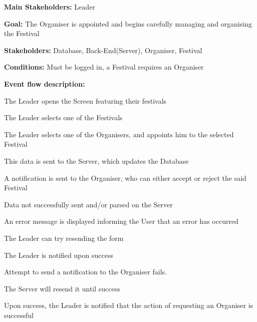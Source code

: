 				\noindent {}
				\begin{packed_item}
					\item \textbf{Main Stakeholders:} Leader
					\item \textbf{Goal:} The Organiser is appointed and begins carefully managing and organising the Festival
					\item \textbf{Stakeholders:} Database, Back-End(Server), Organiser, Festival
					\item \textbf{Conditions:} Must be logged in, a Festival requires an Organiser
					\item \textbf{Event flow description: }
					\begin{packed_enum}
						\item The Leader opens the Screen featuring their festivals
						\item The Leader selects one of the Festivals
						\item The Leader selects one of the Organisers, and appoints him to the selected Festival
						\item This data is sent to the Server, which updates the Database
						\item A notification is sent to the Organiser, who can either accept or reject the said Festival
					\end{packed_enum}
					
					\begin{packed_item}
						
						\item[4.a] Data not successfully sent and/or parsed on the Server
						\item[] \begin{packed_enum}
							\item An error message is displayed informing the User that an error has occurred
							\item The Leader can try resending the form
							\item The Leader is notified upon success
						\end{packed_enum}
					
						\item[5.a] Attempt to send a notification to the Organiser fails.
						\item[] \begin{packed_enum}
							\item The Server will resend it until success
							\item Upon success, the Leader is notified that the action of requesting an Organiser is successful
						\end{packed_enum}
						
					\end{packed_item}
				\end{packed_item}	
					
